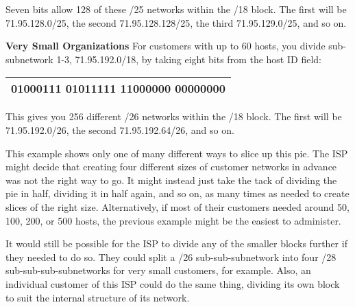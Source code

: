 Seven bits allow 128 of these /25 networks within the /18 block. The
first will be 71.95.128.0/25, the second 71.95.128.128/25, the third
71.95.129.0/25, and so on.

{\textbf{Very Small Organizations}} For customers with up to 60 hosts,
you divide sub-subnetwork 1-3, 71.95.192.0/18, by taking eight bits from
the host ID field:

\begin{longtable}[]{@{}l@{}}
\toprule
\endhead
01000111 0101111{\textbf{1 {11}}}{{000000}} {{00}}000000\tabularnewline
\bottomrule
\end{longtable}

This gives you 256 different /26 networks within the /18 block. The
first will be 71.95.192.0/26, the second 71.95.192.64/26, and so on.

This example shows only one of many different ways to slice up this pie.
The ISP might decide that creating four different sizes of customer
networks in advance was not the right way to go. It might instead just
take the tack of dividing the pie in half, dividing it in half again,
and so on, as many times as needed to create slices of the right size.
Alternatively, if most of their customers needed around 50, 100, 200, or
500 hosts, the previous example might be the easiest to administer.

It would still be possible for the ISP to divide any of the smaller
blocks further if they needed to do so. They could split a /26
sub-sub-subnetwork into four /28 sub-sub-sub-subnetworks for very small
customers, for example. Also, an individual customer of this ISP could
do the same thing, dividing its own block to suit the internal structure
of its network.


